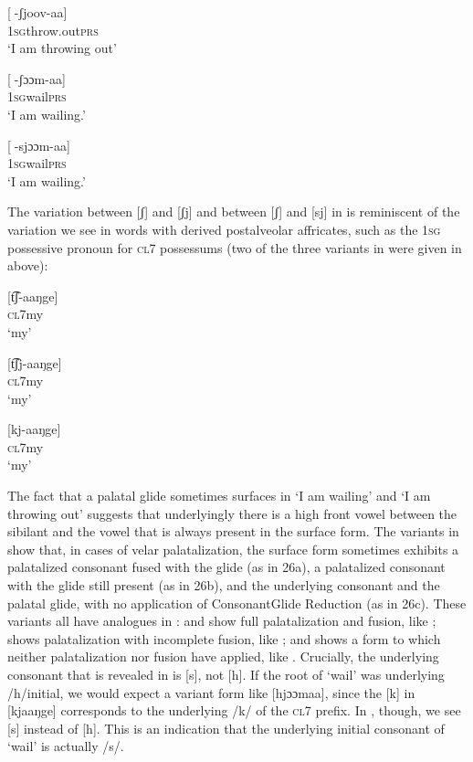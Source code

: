 \documentclass[output=paper]{langsci/langscibook}
\begin{document}
\ea{}
 [-ʃjoov-aa]\\{}
\textsc{1sg}throw.out\textsc{prs}\\{}
\glt ‘I am throwing out’
\z

\ea{}
 [-ʃɔɔm-aa]\\{}
\textsc{1sg}wail\textsc{prs}\\{}
\textsc{‘I} am wailing.’
\z

\ea{}
 [-sjɔɔm-aa]\\{}
\textsc{1sg}wail\textsc{prs}\\{}
\glt ‘I am wailing.’
\z

The variation between [ʃ] and [ʃj] and between [ʃ] and [sj] in  is reminiscent of the variation we see in words with derived postalveolar affricates, such as the 1\textsc{sg} possessive pronoun for \textsc{cl}7 possessums (two of the three variants in  were given in  above):

\ea{}
 [t͡ʃ-aaŋge]\\{}
\textsc{cl7}my\\{}
\glt ‘my’
\z


\ea{}
 [t͡ʃj-aaŋge]\\{}
\textsc{cl7}my\\{}
\glt ‘my’
\z


\ea{}
 [kj-aaŋge]\\{}
\textsc{cl7}my\\{}
\glt ‘my’
\z

The fact that a palatal glide sometimes surfaces in ‘I am wailing’ and ‘I am throwing out’ suggests that underlyingly there is a high front vowel between the sibilant and the vowel that is always present in the surface form. The variants in  show that, in cases of velar palatalization, the surface form sometimes exhibits a palatalized consonant fused with the glide (as in 26a), a palatalized consonant with the glide still present (as in 26b), and the underlying consonant and the palatal glide, with no application of ConsonantGlide Reduction (as in 26c). These variants all have analogues in :  and  show full palatalization and fusion, like ;  shows palatalization with incomplete fusion, like ; and  shows a form to which neither palatalization nor fusion have applied, like . Crucially, the underlying consonant that is revealed in  is [s], not [h]. If the root of ‘wail’ was underlying /h/initial, we would expect a variant form like [hjɔɔmaa], since the [k] in [kjaaŋge] corresponds to the underlying /k/ of the \textsc{cl}7 prefix. In , though, we see [s] instead of [h]. This is an indication that the underlying initial consonant of ‘wail’ is actually /s/. 
\end{document}
